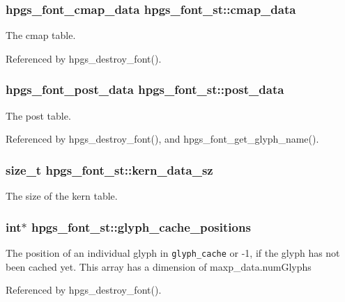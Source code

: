 \subsubsection[cmap\_\-data]{\setlength{\rightskip}{0pt plus 5cm}hpgs\_\-font\_\-cmap\_\-data {\bf hpgs\_\-font\_\-st::cmap\_\-data}}\label{structhpgs__font__st_b5dde9d6e746d6f1988c64f315a41090}


The cmap table. 

Referenced by hpgs\_\-destroy\_\-font().
\subsubsection[post\_\-data]{\setlength{\rightskip}{0pt plus 5cm}hpgs\_\-font\_\-post\_\-data {\bf hpgs\_\-font\_\-st::post\_\-data}}\label{structhpgs__font__st_e75403174e964ab5c13cbf25c351ab20}


The post table. 

Referenced by hpgs\_\-destroy\_\-font(), and hpgs\_\-font\_\-get\_\-glyph\_\-name().
\subsubsection[kern\_\-data\_\-sz]{\setlength{\rightskip}{0pt plus 5cm}size\_\-t {\bf hpgs\_\-font\_\-st::kern\_\-data\_\-sz}}\label{structhpgs__font__st_fe5520a8a87fc7c612951a5a0bba86f3}


The size of the kern table. 
\subsubsection[glyph\_\-cache\_\-positions]{\setlength{\rightskip}{0pt plus 5cm}int$\ast$ {\bf hpgs\_\-font\_\-st::glyph\_\-cache\_\-positions}}\label{structhpgs__font__st_26a6c7172b53abe1a34f150ad47c2410}


The position of an individual glyph in {\tt glyph\_\-cache} or -1, if the glyph has not been cached yet. This array has a dimension of maxp\_\-data.numGlyphs 

Referenced by hpgs\_\-destroy\_\-font().
